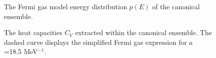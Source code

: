 \begin{figure}
\caption{The Fermi gas model energy distribution $p(E)$ of the canonical
ensemble.}
\end{figure}

\begin{figure}
\setlength{\unitlength}{1mm}
\caption{The heat capacities $C_V$ extracted within the canonical ensemble.
The dashed curve displays the simplified Fermi gas expression for $a$ =18.5
MeV$^{-1}$.}
\end{figure}



